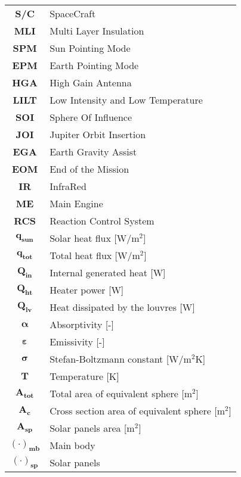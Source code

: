 \begin{multicols}{2}
{\begin{xltabular}{\linewidth}{c>{\raggedright\arraybackslash}X}
		\textbf{S/C} & SpaceCraft \\
		\textbf{MLI} & Multi Layer Insulation \\
		\textbf{SPM} & Sun Pointing Mode \\
		\textbf{EPM} & Earth Pointing Mode \\
		\textbf{HGA} & High Gain Antenna \\
		\textbf{LILT} & Low Intensity and Low Temperature \\
		\textbf{SOI} & Sphere Of Influence \\
		\textbf{JOI} & Jupiter Orbit Insertion \\
		\textbf{EGA} & Earth Gravity Assist \\
		\textbf{EOM} & End of the Mission \\
		\textbf{IR} & InfraRed \\
		\textbf{ME} & Main Engine \\
		\textbf{RCS} & Reaction Control System \\
		$\boldsymbol{q_{sun}}$ & Solar heat flux [W/$\textrm{m}^2$] \\
		$\boldsymbol{q_{tot}}$ & Total heat flux [W/$\textrm{m}^2$] \\
		$\boldsymbol{Q_{in}}$ & Internal generated heat [W]\\
		$\boldsymbol{Q_{ht}}$ & Heater power [W] \\
		$\boldsymbol{Q_{lv}}$ & Heat dissipated by the louvres [W] \\
		$\boldsymbol{\alpha}$ & Absorptivity [-] \\
		$\boldsymbol{\varepsilon}$ & Emissivity [-] \\
		$\boldsymbol{\sigma}$ & Stefan-Boltzmann constant [W/$\textrm{m}^2$K] \\
		$\boldsymbol{T}$ & Temperature [K] \\
		$\boldsymbol{A_{tot}}$ & Total area of equivalent sphere [$\textrm{m}^2$] \\
		$\boldsymbol{A_c}$ & Cross section area of equivalent sphere [$\textrm{m}^2$] \\
		$\boldsymbol{A_{sp}}$ & Solar panels area [$\textrm{m}^2$] \\
		$\boldsymbol{(\cdot)_{mb}}$ & Main body \\
		$\boldsymbol{(\cdot)_{sp}}$ & Solar panels \\
 	\end{xltabular}
	\unskip
	\unpenalty
	\unpenalty}
	\unvbox\ltmcbox
\end{multicols}